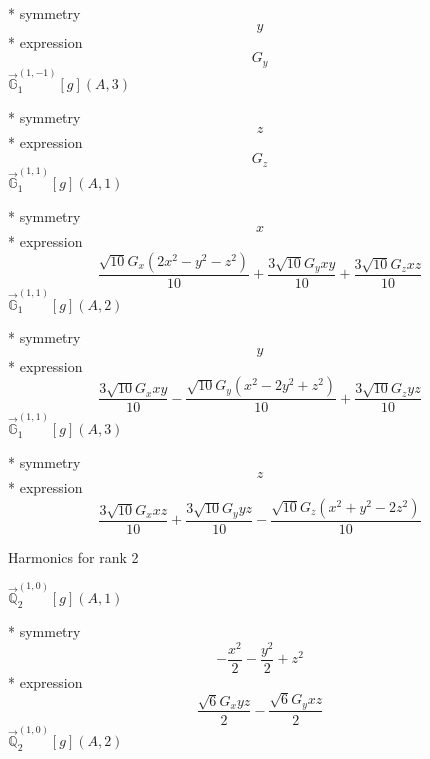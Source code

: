 \documentclass[fleqn,8pt]{jsarticle}
\begin{document}
\noindent\quad ** symmetry
\begin{dmath*}
y
\end{dmath*}
\noindent\quad ** expression
\begin{dmath*}
G_{y}
\end{dmath*}
\noindent\quad $\vec{\mathbb{G}}_{1}^{(1,-1)}[g](A,3)$

\noindent\quad ** symmetry
\begin{dmath*}
z
\end{dmath*}
\noindent\quad ** expression
\begin{dmath*}
G_{z}
\end{dmath*}
\noindent\quad $\vec{\mathbb{G}}_{1}^{(1,1)}[g](A,1)$

\noindent\quad ** symmetry
\begin{dmath*}
x
\end{dmath*}
\noindent\quad ** expression
\begin{dmath*}
\frac{\sqrt{10} G_{x} \left(2 x^{2} - y^{2} - z^{2}\right)}{10} + \frac{3 \sqrt{10} G_{y} x y}{10} + \frac{3 \sqrt{10} G_{z} x z}{10}
\end{dmath*}
\noindent\quad $\vec{\mathbb{G}}_{1}^{(1,1)}[g](A,2)$

\noindent\quad ** symmetry
\begin{dmath*}
y
\end{dmath*}
\noindent\quad ** expression
\begin{dmath*}
\frac{3 \sqrt{10} G_{x} x y}{10} - \frac{\sqrt{10} G_{y} \left(x^{2} - 2 y^{2} + z^{2}\right)}{10} + \frac{3 \sqrt{10} G_{z} y z}{10}
\end{dmath*}
\noindent\quad $\vec{\mathbb{G}}_{1}^{(1,1)}[g](A,3)$

\noindent\quad ** symmetry
\begin{dmath*}
z
\end{dmath*}
\noindent\quad ** expression
\begin{dmath*}
\frac{3 \sqrt{10} G_{x} x z}{10} + \frac{3 \sqrt{10} G_{y} y z}{10} - \frac{\sqrt{10} G_{z} \left(x^{2} + y^{2} - 2 z^{2}\right)}{10}
\end{dmath*}

\noindent * Harmonics for rank 2

\noindent\quad $\vec{\mathbb{Q}}_{2}^{(1,0)}[g](A,1)$

\noindent\quad ** symmetry
\begin{dmath*}
- \frac{x^{2}}{2} - \frac{y^{2}}{2} + z^{2}
\end{dmath*}
\noindent\quad ** expression
\begin{dmath*}
\frac{\sqrt{6} G_{x} y z}{2} - \frac{\sqrt{6} G_{y} x z}{2}
\end{dmath*}
\noindent\quad $\vec{\mathbb{Q}}_{2}^{(1,0)}[g](A,2)$
\end{document}
